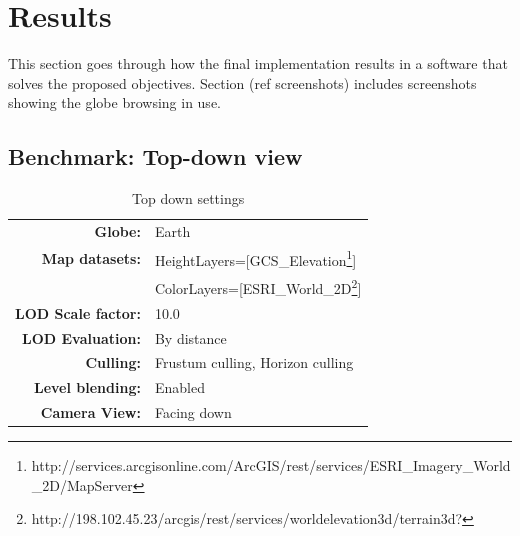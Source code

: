 \chapter{Results}
This section goes through how the final implementation results in a software that solves the proposed objectives. Section (ref screenshots) includes screenshots showing the globe browsing in use.

\section{Benchmark: Top-down view}


\begin{table}
  \centering
  \caption[]{Top down settings}
    \label{table:settingstopdown}
  \begin{tabular}{| r l |}
    \hline
      \textbf{Globe:}             & Earth \\
      \textbf{Map datasets:}      & HeightLayers=[GCS\_Elevation\footnote{http://services.arcgisonline.com/ArcGIS/rest/services/ESRI\_Imagery\_World\_2D/MapServer}] \\
                                  & ColorLayers=[ESRI\_World\_2D\footnote{http://198.102.45.23/arcgis/rest/services/worldelevation3d/terrain3d?}] \\
      \textbf{LOD Scale factor:}  & 10.0 \\
      \textbf{LOD Evaluation:}    & By distance \\
      \textbf{Culling:}           & Frustum culling, Horizon culling \\
      \textbf{Level blending:}    & Enabled \\
      \textbf{Camera View:}       & Facing down \\
    \hline
  \end{tabular}
\end{table}


